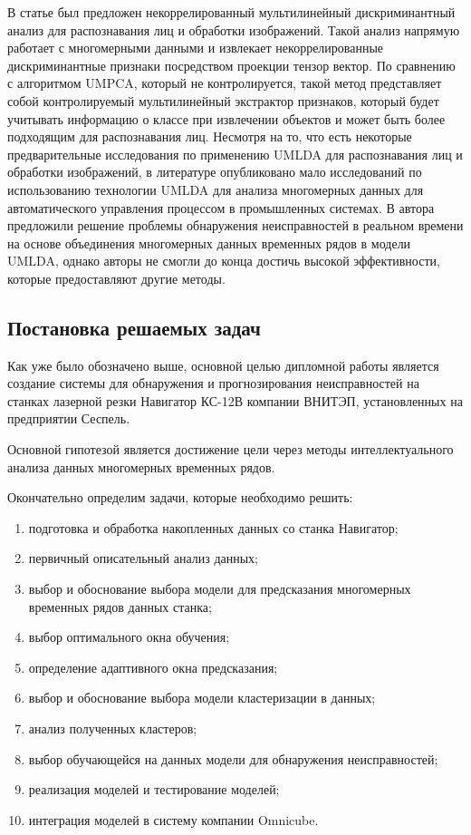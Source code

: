 В статье \cite{4-17} был предложен некоррелированный мультилинейный дискриминантный анализ 
для распознавания лиц и обработки изображений. 
Такой анализ напрямую работает с многомерными данными и извлекает некоррелированные 
дискриминантные признаки посредством проекции тензор вектор. 
По сравнению с алгоритмом UMPCA, который не контролируется, такой метод представляет собой контролируемый 
мультилинейный экстрактор признаков, который будет учитывать информацию о классе при извлечении объектов 
и может быть более подходящим для распознавания лиц. 
Несмотря на то, что есть некоторые предварительные исследования по применению UMLDA для распознавания лиц и обработки изображений, 
в литературе опубликовано мало исследований по использованию технологии 
UMLDA для анализа многомерных данных для автоматического управления процессом в промышленных системах.
В \cite{4} автора предложили решение проблемы обнаружения неисправностей в реальном времени
на основе объединения многомерных данных временных рядов в модели UMLDA,
однако авторы не смогли до конца достичь высокой эффективности,
которые предоставляют другие методы.

\subsection{Постановка решаемых задач}

Как уже было обозначено выше, основной целью дипломной работы является создание системы
для обнаружения и прогнозирования неисправностей на станках лазерной резки Навигатор КС-12В компании ВНИТЭП,
установленных на предприятии Сеспель.

Основной гипотезой является достижение цели через
методы интеллектуального анализа данных многомерных временных рядов.

Окончательно определим задачи, которые необходимо решить:

\begin{enumerate}
    \item подготовка и обработка накопленных данных со станка Навигатор;
    \item первичный описательный анализ данных;
    \item выбор и обоснование выбора модели для предсказания многомерных временных рядов данных станка;
    \item выбор оптимального окна обучения;
    \item определение адаптивного окна предсказания;
    \item выбор и обоснование выбора модели кластеризации в данных;
    \item анализ полученных кластеров;
    \item выбор обучающейся на данных модели для обнаружения неисправностей;    
    \item реализация моделей и тестирование моделей;
    \item интеграция моделей в систему компании Omnicube.
\end{enumerate}

